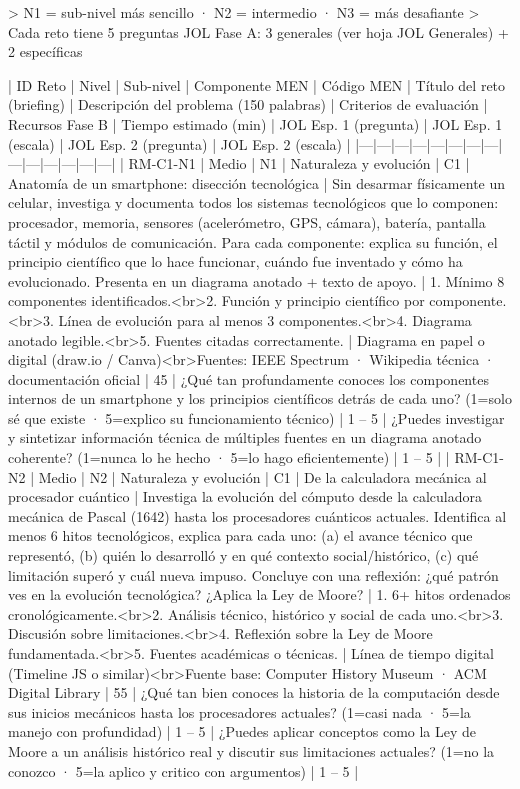 > N1 = sub-nivel más sencillo · N2 = intermedio · N3 = más desafiante  
> Cada reto tiene 5 preguntas JOL Fase A: 3 generales (ver hoja JOL Generales) + 2 específicas

| ID Reto | Nivel | Sub-nivel | Componente MEN | Código MEN | Título del reto (briefing) | Descripción del problema (150 palabras) | Criterios de evaluación | Recursos Fase B | Tiempo estimado (min) | JOL Esp. 1 (pregunta) | JOL Esp. 1 (escala) | JOL Esp. 2 (pregunta) | JOL Esp. 2 (escala) |
|---|---|---|---|---|---|---|---|---|---|---|---|---|---|
| RM-C1-N1 | Medio | N1 | Naturaleza y evolución | C1 | Anatomía de un smartphone: disección tecnológica | Sin desarmar físicamente un celular, investiga y documenta todos los sistemas tecnológicos que lo componen: procesador, memoria, sensores (acelerómetro, GPS, cámara), batería, pantalla táctil y módulos de comunicación. Para cada componente: explica su función, el principio científico que lo hace funcionar, cuándo fue inventado y cómo ha evolucionado. Presenta en un diagrama anotado + texto de apoyo. | 1. Mínimo 8 componentes identificados.<br>2. Función y principio científico por componente.<br>3. Línea de evolución para al menos 3 componentes.<br>4. Diagrama anotado legible.<br>5. Fuentes citadas correctamente. | Diagrama en papel o digital (draw.io / Canva)<br>Fuentes: IEEE Spectrum · Wikipedia técnica · documentación oficial | 45 | ¿Qué tan profundamente conoces los componentes internos de un smartphone y los principios científicos detrás de cada uno? (1=solo sé que existe · 5=explico su funcionamiento técnico) | 1 – 5 | ¿Puedes investigar y sintetizar información técnica de múltiples fuentes en un diagrama anotado coherente? (1=nunca lo he hecho · 5=lo hago eficientemente) | 1 – 5 |
| RM-C1-N2 | Medio | N2 | Naturaleza y evolución | C1 | De la calculadora mecánica al procesador cuántico | Investiga la evolución del cómputo desde la calculadora mecánica de Pascal (1642) hasta los procesadores cuánticos actuales. Identifica al menos 6 hitos tecnológicos, explica para cada uno: (a) el avance técnico que representó, (b) quién lo desarrolló y en qué contexto social/histórico, (c) qué limitación superó y cuál nueva impuso. Concluye con una reflexión: ¿qué patrón ves en la evolución tecnológica? ¿Aplica la Ley de Moore? | 1. 6+ hitos ordenados cronológicamente.<br>2. Análisis técnico, histórico y social de cada uno.<br>3. Discusión sobre limitaciones.<br>4. Reflexión sobre la Ley de Moore fundamentada.<br>5. Fuentes académicas o técnicas. | Línea de tiempo digital (Timeline JS o similar)<br>Fuente base: Computer History Museum · ACM Digital Library | 55 | ¿Qué tan bien conoces la historia de la computación desde sus inicios mecánicos hasta los procesadores actuales? (1=casi nada · 5=la manejo con profundidad) | 1 – 5 | ¿Puedes aplicar conceptos como la Ley de Moore a un análisis histórico real y discutir sus limitaciones actuales? (1=no la conozco · 5=la aplico y critico con argumentos) | 1 – 5 |
